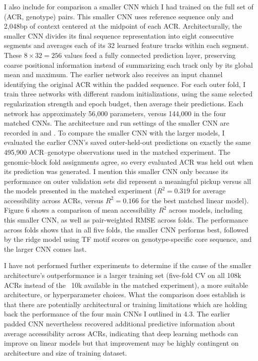 \documentclass[10pt]{article}
\begin{document}
I also include for comparison a smaller CNN which I had trained on the full set of (ACR, genotype) pairs. This smaller CNN uses reference sequence only and 2,048bp of context centered at the midpoint of each ACR. Architecturally, the smaller CNN divides its final sequence representation into eight consecutive segments and averages each of its 32 learned feature tracks within each segment. These
$8\times32=256$ values feed a fully connected prediction layer,
preserving coarse positional information instead of summarizing
each track only by its global mean and maximum. The earlier
network also receives an input channel identifying the original
ACR within the padded sequence. For each outer fold, I train
three networks with different random initializations, using the
same selected regularization strength and epoch budget, then
average their predictions. Each network has approximately 56,000
parameters, versus 144,000 in the four matched CNNs. The architecture and run settings of the smaller CNN are recorded in
 and
. To compare the smaller CNN with the larger models, I evaluated the earlier CNN's saved
outer-held-out predictions on exactly the same 495,900
ACR--genotype observations used in the matched experiment. The genomic-block fold
assignments agree, so every evaluated ACR was held out when
its prediction was generated. I mention this smaller CNN only because its performance on outer validation sets did represent a meaningful pickup versus all the models presented in the matched experiment ($R^2=0.319$ for average accessibility across ACRs, versus
$R^2=0.166$ for the best matched linear model). Figure 6 shows a comparison of mean accessibility $R^2$ across models, including this smaller CNN, as well as pair-weighted RMSE across folds. The performance across folds shows that in all five folds, the smaller CNN performs best, followed by the ridge model using TF motif scores on genotype-specific core sequence, and the larger CNN comes last. 



I have not performed further experiments to determine if the cause of the smaller architecture's outperformance is a larger training set (five-fold CV on all 108k ACRs instead of the ~10k available in the matched experiment), a more suitable architecture, or hyperparameter choices. What the comparison does establish is that there are potentially architectural or training limitations which are holding back the performance of the four main CNNs I outlined in 4.3. The earlier padded CNN nevertheless recovered additional predictive information about average accessibility
across ACRs, indicating that deep learning methods can improve on linear models but that improvement may be highly contingent on architecture and size of training dataset. 
\end{document}
